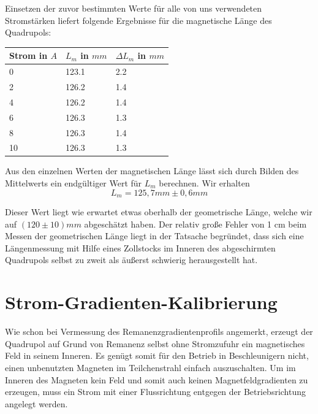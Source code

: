 \documentclass[bigchapter,colorback,accentcolor=tud4b,linedtoc,11pt]{tudreport}
\begin{document}
Einsetzen der zuvor bestimmten Werte für alle von uns verwendeten Stromstärken liefert folgende Ergebnisse für die magnetische Länge des Quadrupols:
\begin{center}
  \begin{tabular}{|p{2.6cm}|p{2.6cm}|p{2.6cm}|}
    \hline
    Strom in $A$ & $L_m$ in $mm$ & $\Delta L_m$ in $mm$ \\ \hline
    0            & 123.1         & 2.2                  \\ \hline
    2            & 126.2         & 1.4                  \\ \hline
    4            & 126.2         & 1.4                  \\ \hline
    6            & 126.3         & 1.3                  \\ \hline
    8            & 126.3         & 1.4                  \\ \hline
    10           & 126.3         & 1.3                  \\ \hline
	\end{tabular}
\end{center}

Aus den einzelnen Werten der magnetischen Länge lässt sich durch Bilden des Mittelwerts ein endgültiger Wert für $L_m$ berechnen. Wir erhalten $$L_m=125,7mm\pm0,6mm$$

Dieser Wert liegt wie erwartet etwas oberhalb der geometrische Länge, welche wir auf $(120 \pm 10)mm$ abgeschätzt haben. Der relativ große Fehler von 1 cm beim Messen der geometrischen Länge liegt in der Tatsache begründet, dass sich eine Längenmessung mit Hilfe eines Zollstocks im Inneren des abgeschirmten Quadrupols selbst zu zweit als äußerst schwierig herausgestellt hat.

\section{Strom-Gradienten-Kalibrierung}
Wie schon bei Vermessung des Remanenzgradientenprofils angemerkt, erzeugt der Quadrupol auf Grund von Remanenz selbst ohne Stromzufuhr ein magnetisches Feld in seinem Inneren. Es genügt somit für den Betrieb in Beschleunigern nicht, einen unbenutzten Magneten im Teilchenstrahl einfach auszuschalten. Um im Inneren des Magneten kein Feld und somit auch keinen Magnetfeldgradienten zu erzeugen, muss ein Strom mit einer Flussrichtung entgegen der Betriebsrichtung angelegt werden.
\end{document}
